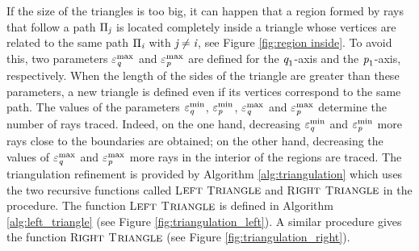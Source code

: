 If the size of the triangles is too big, it can happen that a region formed by rays that follow a path $\Pi_{\textit{j}}$ is located completely inside a triangle whose vertices are related to the same path $\Pi_{\textit{i}}$ with $\textit{j} \neq  \textit{i}$, see Figure \ref{fig:region inside}.
To avoid this, two parameters $\varepsilon_{\textit{q}}^{\textrm{max}}$ and $\varepsilon_{\textit{p}}^{\textrm{max}}$ are defined for the $\textit{q}_1$-axis and the $\textit{p}_1$-axis, respectively.
When the length of the sides of the triangle are greater than these parameters, a new triangle is defined even if its vertices correspond to the same path.
The values of the parameters $\varepsilon_{\textit{q}}^\textrm{min}$, $\varepsilon_{\textit{p}}^\textrm{min}$, $\varepsilon_{\textit{q}}^\textrm{max}$ and $\varepsilon_{\textit{p}}^\textrm{max}$ determine the number of rays traced.
Indeed, on the one hand, decreasing $\varepsilon_{\textit{q}}^\textrm{min}$ and $\varepsilon_{\textit{p}}^\textrm{min}$ more rays close to the boundaries are obtained;
on the other hand, decreasing the values of $\varepsilon_{\textit{q}}^\textrm{max}$ and $\varepsilon_{\textit{p}}^\textrm{max}$ more rays in the interior of the regions are traced. The triangulation refinement is provided by Algorithm \ref{alg:triangulation} which uses the two recursive functions called  L$\footnotesize{\textrm{EFT}}$ T$\footnotesize{\textrm{RIANGLE}}$ and  R$\footnotesize{\textrm{IGHT}}$ T$\footnotesize{\textrm{RIANGLE}}$ in the procedure.
The function L$\footnotesize{\textrm{EFT}}$ T$\footnotesize{\textrm{RIANGLE}}$ is defined in Algorithm \ref{alg:left_triangle} (see Figure \ref{fig:triangulation_left}). 
A similar procedure gives the function R$\footnotesize{\textrm{IGHT}}$ T$\footnotesize{\textrm{RIANGLE}}$ (see Figure \ref{fig:triangulation_right}).
